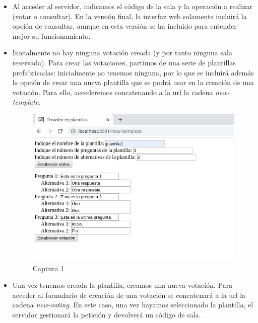 \documentclass{article}
\begin{document}
\begin{itemize}
	\item Al acceder al servidor, indicamos el código de la sala y la operación a realizar (votar o consultar). En la versión final, la interfaz web solamente incluirá la opción de consultar, aunque en esta versión se ha incluido para entender mejor su funcionamiento.
	

	\item Inicialmente no hay ninguna votación creada (y por tanto ninguna sala reservada). Para crear las votaciones, partimos de una serie de plantillas prefabricadas: inicialmente no tenemos ninguna, por lo que se incluirá además la opción de crear una nueva plantilla que se podrá usar en la creación de una votación. Para ello, accederemos concatenando a la url la cadena \textit{new-template}.
	
	\begin{figure}[H]
		\centering
		\includegraphics[totalheight=9.25cm]{img/cap1}
		\caption{Captura 1}
		\label{fig:figura2}
	\end{figure}

	\item Una vez tenemos creada la plantilla, creamos una nueva votación. Para acceder al formulario de creación de una votación se concatenará a la url la cadena \textit{new-voting}. En este caso, una vez hayamos seleccionado la plantilla, el servidor gestionará la petición y devolverá un código de sala.
	

\end{itemize}
\end{document}
